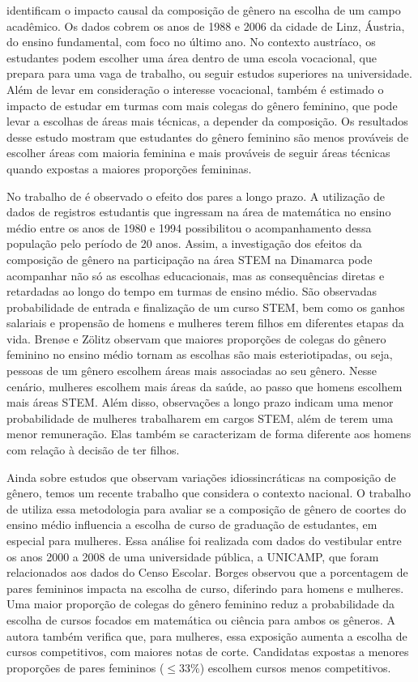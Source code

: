 \citet{Schneeweis2012} identificam o impacto causal da composição de gênero na escolha de um campo acadêmico. Os dados cobrem os anos de 1988 e 2006 da cidade de Linz, Áustria, do ensino fundamental, com foco no último ano. No contexto austríaco, os estudantes podem escolher uma área dentro de uma escola vocacional, que prepara para uma vaga de trabalho, ou seguir estudos superiores na universidade. Além de levar em consideração o interesse vocacional, também é estimado o impacto de estudar em turmas com mais colegas do gênero feminino, que pode levar a escolhas de áreas mais técnicas, a depender da composição. Os resultados desse estudo mostram que estudantes do gênero feminino são menos prováveis de escolher áreas com maioria feminina e mais prováveis de seguir áreas técnicas quando expostas a maiores proporções femininas.

No trabalho de \citet{Brene2020} é observado o efeito dos pares a longo prazo. A utilização de dados de registros estudantis que ingressam na área de matemática no ensino médio entre os anos de 1980 e 1994 possibilitou o acompanhamento dessa população pelo período de 20 anos. Assim, a investigação dos efeitos da composição de gênero na participação na área STEM na Dinamarca pode acompanhar não só as escolhas educacionais, mas as consequências diretas e retardadas ao longo do tempo em turmas de ensino médio. São observadas probabilidade de entrada e finalização de um curso STEM, bem como os ganhos salariais e propensão de homens e mulheres terem filhos em diferentes etapas da vida. Brenøe e Zölitz observam que maiores proporções de colegas do gênero feminino no ensino médio tornam as escolhas são mais esteriotipadas, ou seja, pessoas de um gênero escolhem áreas mais associadas ao seu gênero. Nesse cenário, mulheres escolhem mais áreas da saúde, ao passo que homens escolhem mais áreas STEM. Além disso, observações a longo prazo indicam uma menor probabilidade de mulheres trabalharem em cargos STEM, além de terem uma menor remuneração. Elas também se caracterizam de forma diferente aos homens com relação à decisão de ter filhos.

Ainda sobre estudos que observam variações idiossincráticas na composição de gênero, temos um recente trabalho que considera o contexto nacional. O trabalho de \citet{Borges2021} utiliza essa metodologia para avaliar se a composição de gênero de coortes do ensino médio influencia a escolha de curso de graduação de estudantes, em especial para mulheres. Essa análise foi realizada com dados do vestibular entre os anos 2000 a 2008 de uma universidade pública, a UNICAMP, que foram relacionados aos dados do Censo Escolar. Borges observou que a porcentagem de pares femininos impacta na escolha de curso, diferindo para homens e mulheres. Uma maior proporção de colegas do gênero feminino reduz a probabilidade da escolha de cursos focados em matemática ou ciência para ambos os gêneros. A autora também verifica que, para mulheres, essa exposição aumenta a escolha de cursos competitivos, com maiores notas de corte. Candidatas expostas a menores proporções de pares femininos ($\le33\%$) escolhem cursos menos competitivos.

